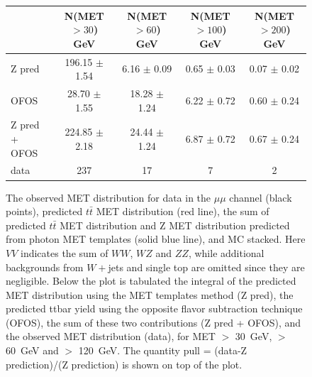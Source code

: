 \begin{figure}[hbtp]
  \begin{center}

	\medskip 

    \begin{tabular}{lcccc}
\hline
                        &   N(MET $>30$)  GeV    &   N(MET $>60$)  GeV    &   N(MET $>100$) GeV    &   N(MET $>200$) GeV \\
\hline
              Z pred    &  196.15 $\pm$  1.54    &   6.16  $\pm$  0.09    &    0.65 $\pm$  0.03    &   0.07  $\pm$  0.02 \\
                OFOS    &   28.70 $\pm$  1.55    &  18.28  $\pm$  1.24    &    6.22 $\pm$  0.72    &   0.60  $\pm$  0.24 \\
\hline
       Z pred + OFOS    &  224.85 $\pm$  2.18    &  24.44  $\pm$  1.24    &    6.87 $\pm$  0.72    &   0.67  $\pm$  0.24 \\
\hline
                   data &    237                 &    17                  &     7                  &     2 \\

\hline
    \end{tabular}

    \caption{
      The observed MET distribution for data in the $\mu\mu$ channel (black points),
      predicted $t\bar{t}$ MET distribution (red line), the sum of predicted $t\bar{t}$ MET distribution and
      Z  MET  distribution  predicted  from photon  MET  templates
      (solid blue line),  and MC stacked. Here $VV$  indicates the sum
      of  $WW$,  $WZ$  and  $ZZ$, while  additional  backgrounds  from
      $W+$jets   and   single  top   are   omitted   since  they   are
      negligible.  Below the  plot is  tabulated the  integral  of the
      predicted  MET distribution  using the  MET templates  method (Z
      pred),  the  predicted ttbar  yield  using  the opposite  flavor
      subtraction  technique (OFOS), the  sum of  these two
      contributions (Z pred + OFOS), and the observed MET distribution
      (data), for  MET $>$ 30~GeV,  $>$ 60~GeV and $>$  120~GeV. The
      quantity pull  = (data-Z prediction)/(Z prediction)  is shown on
      top  of the  plot.  
    }
    \label{fig:pfmet_mm}
  \end{center}
\end{figure}


